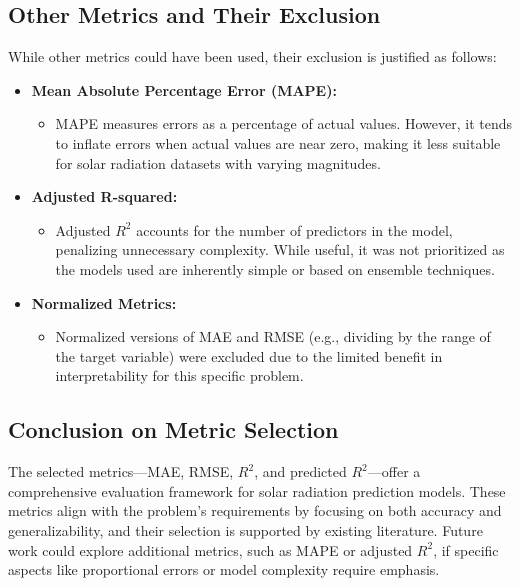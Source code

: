 \documentclass[10pt,twocolumn]{article}
\begin{document}
\begin{itemize}
\subsection*{Other Metrics and Their Exclusion}

While other metrics could have been used, their exclusion is justified as follows:
\begin{itemize}
    \item \textbf{Mean Absolute Percentage Error (MAPE):}
    \begin{itemize}
        \item MAPE measures errors as a percentage of actual values. However, it tends to inflate errors when actual values are near zero, making it less suitable for solar radiation datasets with varying magnitudes.
    \end{itemize}

    \item \textbf{Adjusted R-squared:}
    \begin{itemize}
        \item Adjusted \( R^2 \) accounts for the number of predictors in the model, penalizing unnecessary complexity. While useful, it was not prioritized as the models used are inherently simple or based on ensemble techniques.
    \end{itemize}

    \item \textbf{Normalized Metrics:}
    \begin{itemize}
        \item Normalized versions of MAE and RMSE (e.g., dividing by the range of the target variable) were excluded due to the limited benefit in interpretability for this specific problem.
    \end{itemize}
\end{itemize}

\subsection*{Conclusion on Metric Selection}

The selected metrics—MAE, RMSE, \( R^2 \), and predicted \( R^2 \)—offer a comprehensive evaluation framework for solar radiation prediction models. These metrics align with the problem's requirements by focusing on both accuracy and generalizability, and their selection is supported by existing literature. Future work could explore additional metrics, such as MAPE or adjusted \( R^2 \), if specific aspects like proportional errors or model complexity require emphasis.



\end{itemize}
\end{document}
